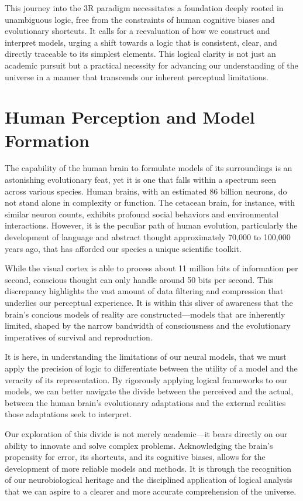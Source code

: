 \documentclass[12pt]{article}
\begin{document}
This journey into the 3R paradigm necessitates a foundation deeply rooted in unambiguous logic, free from the constraints of human cognitive biases and evolutionary shortcuts. It calls for a reevaluation of how we construct and interpret models, urging a shift towards a logic that is consistent, clear, and directly traceable to its simplest elements. This logical clarity is not just an academic pursuit but a practical necessity for advancing our understanding of the universe in a manner that transcends our inherent perceptual limitations.

\section*{Human Perception and Model Formation}
The capability of the human brain to formulate models of its surroundings is an astonishing evolutionary feat, yet it is one that falls within a spectrum seen across various species. Human brains, with an estimated 86 billion neurons, do not stand alone in complexity or function. The cetacean brain, for instance, with similar neuron counts, exhibits profound social behaviors and environmental interactions. However, it is the peculiar path of human evolution, particularly the development of language and abstract thought approximately 70,000 to 100,000 years ago, that has afforded our species a unique scientific toolkit.

While the visual cortex is able to process about 11 million bits of information per second, conscious thought can only handle around 50 bits per second. This discrepancy highlights the vast amount of data filtering and compression that underlies our perceptual experience. It is within this sliver of awareness that the brain's concious models of reality are constructed—models that are inherently limited, shaped by the narrow bandwidth of consciousness and the evolutionary imperatives of survival and reproduction.

It is here, in understanding the limitations of our neural models, that we must apply the precision of logic to differentiate between the utility of a model and the veracity of its representation. By rigorously applying logical frameworks to our models, we can better navigate the divide between the perceived and the actual, between the human brain's evolutionary adaptations and the external realities those adaptations seek to interpret.

Our exploration of this divide is not merely academic—it bears directly on our ability to innovate and solve complex problems. Acknowledging the brain's propensity for error, its shortcuts, and its cognitive biases, allows for the development of more reliable models and methods. It is through the recognition of our neurobiological heritage and the disciplined application of logical analysis that we can aspire to a clearer and more accurate comprehension of the universe.
\end{document}
